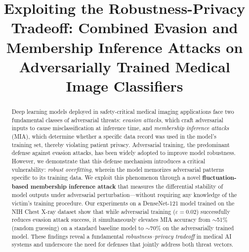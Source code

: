 \documentclass[conference]{IEEEtran}
\begin{document}

\title{Exploiting the Robustness-Privacy Tradeoff: Combined Evasion and Membership Inference Attacks on Adversarially Trained Medical Image Classifiers}

\author{
    \and
}

\maketitle


\begin{abstract}
Deep learning models deployed in safety-critical medical imaging applications face two fundamental classes of adversarial threats: \textit{evasion attacks}, which craft adversarial inputs to cause misclassification at inference time, and \textit{membership inference attacks} (MIA), which determine whether a specific data record was used in the model's training set, thereby violating patient privacy. Adversarial training, the predominant defense against evasion attacks, has been widely adopted to improve model robustness. However, we demonstrate that this defense mechanism introduces a critical vulnerability: \textit{robust overfitting}, wherein the model memorizes adversarial patterns specific to its training data. We exploit this phenomenon through a novel \textbf{fluctuation-based membership inference attack} that measures the differential stability of model outputs under adversarial perturbation---without requiring any knowledge of the victim's training procedure. Our experiments on a DenseNet-121 model trained on the NIH Chest X-ray dataset show that while adversarial training ($\varepsilon = 0.02$) successfully reduces evasion attack success, it simultaneously elevates MIA accuracy from $\sim$51\% (random guessing) on a standard baseline model to $\sim$70\% on the adversarially trained model. These findings reveal a fundamental \textit{robustness--privacy tradeoff} in medical AI systems and underscore the need for defenses that jointly address both threat vectors.
\end{abstract}
\end{document}
